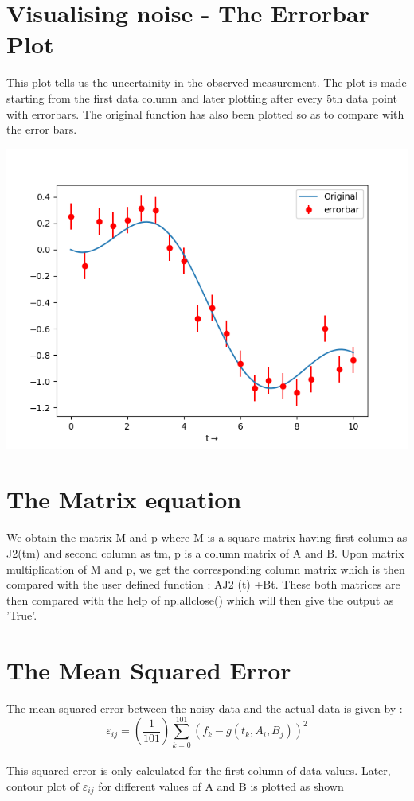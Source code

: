\documentclass[10pt,a4paper]{article}
\begin{document}
\section{Visualising noise - The Errorbar Plot}

This plot tells us the uncertainity in the observed measurement. The plot is made starting from the first data column and later plotting after every 5th data point with errorbars. The original function has also been plotted so as to compare with the error bars.

\includegraphics{figure_2.png}

\section{The Matrix equation}
We obtain the matrix M and p where M is a square matrix having first column as J2(tm) and second column as tm, p is a column matrix of A and B. Upon matrix multiplication of M and p, we get the corresponding column matrix which is then compared with the user defined function : AJ2 (t) +Bt. These both matrices are then compared with the help of np.allclose() which will then give the output as 'True'.

\section{The Mean Squared Error}
The mean squared error between the noisy data and the actual data is given by : 
$$\varepsilon_{ij} = (\frac{1}{101})\sum_{k=0}^{101}(f_{k} - g(t_{k},A_{i},B_{j}))^{2}$$ \\
This squared error is only calculated for the first column of data values.
Later, contour plot of $\varepsilon_{ij}$  for different values of A and B is plotted as shown 
\end{document}
